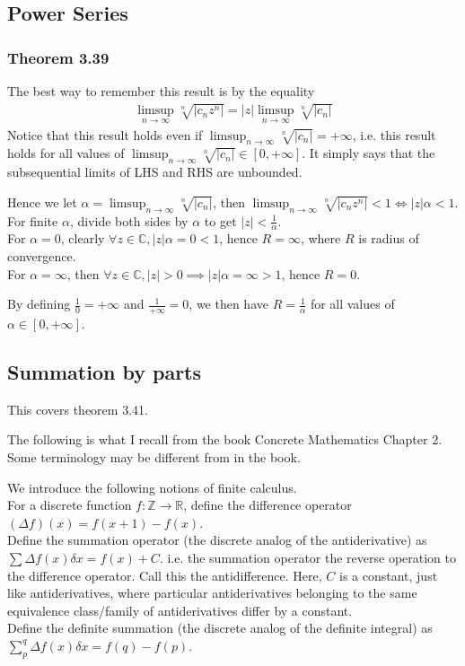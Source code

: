 \documentclass{article}
\begin{document}
\subsection{Power Series}
\subsubsection{Theorem 3.39}
The best way to remember this result is by the equality 
\begin{align*}
	\limsup_{n\rightarrow \infty}\sqrt[n]{|c_nz^n|}=|z|\limsup_{n\rightarrow \infty}\sqrt[n]{|c_n|}
\end{align*}
Notice that this result holds even if $\limsup_{n\rightarrow \infty}\sqrt[n]{|c_n|}=+\infty$, i.e. this result holds for all values of $\limsup_{n\rightarrow \infty}\sqrt[n]{|c_n|}\in [0, +\infty]$. It simply says that the subsequential limits of LHS and RHS are unbounded.

Hence we let $\alpha=\limsup_{n\rightarrow \infty}\sqrt[n]{|c_n|}$, then $\limsup_{n\rightarrow \infty}\sqrt[n]{|c_nz^n|}<1 \iff |z|\alpha<1$.\\
For finite $\alpha$, divide both sides by $\alpha$ to get $|z|<\frac{1}{\alpha}$.\\
For $\alpha=0$, clearly $\forall z\in \mathbb{C}, |z|\alpha=0<1$, hence $R=\infty$, where $R$ is radius of convergence.\\
For $\alpha=\infty$, then $\forall z\in \mathbb{C}, |z|>0 \implies |z|\alpha=\infty > 1$, hence $R=0$.

By defining $\frac{1}{0}=+\infty$ and $\frac{1}{+\infty}=0$, we then have $R=\frac{1}{\alpha}$ for all values of $\alpha \in [0, +\infty]$.

\subsection{Summation by parts}
This covers theorem 3.41.

The following is what I recall from the book Concrete Mathematics Chapter 2. Some terminology may be different from in the book.

We introduce the following notions of finite calculus.\\
For a discrete function $f: \mathbb{Z} \rightarrow \mathbb{R}$, define the difference operator $(\Delta f)(x) = f(x+1) - f(x)$.\\
Define the summation operator (the discrete analog of the antiderivative) as $\sum \Delta f(x) \delta x=f(x)+C$. i.e. the summation operator the reverse operation to the difference operator. Call this the antidifference. Here, $C$ is a constant, just like antiderivatives, where particular antiderivatives belonging to the same equivalence class/family of antiderivatives differ by a constant. \\
Define the definite summation (the discrete analog of the definite integral) as $\sum_p^q \Delta f(x) \delta x = f(q) - f(p)$.
\end{document}
